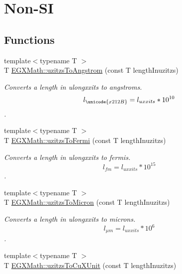 \hypertarget{group___e_g_x_math-_conversions-_length_conversions-uzitzs-_non-_s_i}{}\section{Non-\/\+SI}
\label{group___e_g_x_math-_conversions-_length_conversions-uzitzs-_non-_s_i}
\subsection*{Functions}
\begin{DoxyCompactItemize}
\item 
{\footnotesize template$<$typename T $>$ }\\T \mbox{\hyperlink{group___e_g_x_math-_conversions-_length_conversions-uzitzs-_non-_s_i_gaaaecee65b1db5abcc71e18526e7073eb}{E\+G\+X\+Math\+::uzitzs\+To\+Angstrom}} (const T length\+Inuzitzs)
\begin{DoxyCompactList}\small\item\em Converts a length in ulongxxits to angstroms. \[ l_{\unicode{x212B}}=l_{uxxits} * 10^{10} \]. \end{DoxyCompactList}\item 
{\footnotesize template$<$typename T $>$ }\\T \mbox{\hyperlink{group___e_g_x_math-_conversions-_length_conversions-uzitzs-_non-_s_i_ga920cd8aae6bc9f70faa49a6a5c988040}{E\+G\+X\+Math\+::uzitzs\+To\+Fermi}} (const T length\+Inuzitzs)
\begin{DoxyCompactList}\small\item\em Converts a length in ulongxxits to fermis. \[ l_{fm}=l_{uxxits} * 10^{15} \]. \end{DoxyCompactList}\item 
{\footnotesize template$<$typename T $>$ }\\T \mbox{\hyperlink{group___e_g_x_math-_conversions-_length_conversions-uzitzs-_non-_s_i_ga695a8fd8870537930d6378e99ad2aa9f}{E\+G\+X\+Math\+::uzitzs\+To\+Micron}} (const T length\+Inuzitzs)
\begin{DoxyCompactList}\small\item\em Converts a length in ulongxxits to microns. \[ l_{\mu m}=l_{uxxits} * 10^{6} \]. \end{DoxyCompactList}\item 
{\footnotesize template$<$typename T $>$ }\\T \mbox{\hyperlink{group___e_g_x_math-_conversions-_length_conversions-uzitzs-_non-_s_i_gab25470e41b88c41d4bf32622baa6c472}{E\+G\+X\+Math\+::uzitzs\+To\+Cu\+X\+Unit}} (const T length\+Inuzitzs)

\end{DoxyCompactItemize}
